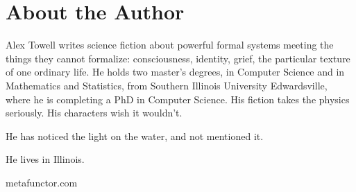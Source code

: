 \chapter*{About the Author}

Alex Towell writes science fiction about powerful formal systems meeting the things they cannot formalize: consciousness, identity, grief, the particular texture of one ordinary life. He holds two master's degrees, in Computer Science and in Mathematics and Statistics, from Southern Illinois University Edwardsville, where he is completing a PhD in Computer Science. His fiction takes the physics seriously. His characters wish it wouldn't.

He has noticed the light on the water, and not mentioned it.

He lives in Illinois.

\vspace{1em}
\noindent metafunctor.com
